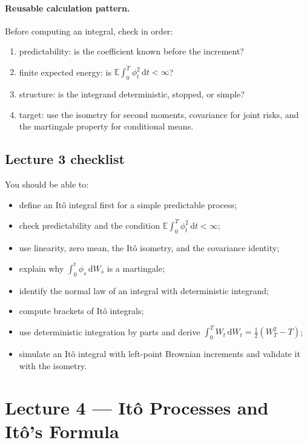 \documentclass[11pt]{article}
\newcommand{\E}{\mathbb{E}}
\newcommand{\dd}{\,\mathrm{d}}
\newcommand{\1}{\mathbf{1}}
\theoremstyle{plain}
\theoremstyle{definition}
\theoremstyle{remark}
\begin{document}
\paragraph{Reusable calculation pattern.}
Before computing an integral, check in order:
\begin{enumerate}[leftmargin=1.6em,itemsep=0.15em]
  \item predictability: is the coefficient known before the increment?
  \item finite expected energy: is
        \(\E\int_0^T\phi_t^2\dd t<\infty\)?
  \item structure: is the integrand deterministic, stopped, or simple?
  \item target: use the isometry for second moments, covariance for joint
        risks, and the martingale property for conditional means.
\end{enumerate}

\subsection*{Lecture 3 checklist}

You should be able to:
\begin{itemize}[leftmargin=1.5em,itemsep=0.15em]
  \item define an It\^o integral first for a simple predictable process;
  \item check predictability and the condition
        $\E\int_0^T\phi_t^2\dd t<\infty$;
  \item use linearity, zero mean, the It\^o isometry, and the covariance
        identity;
  \item explain why $\int_0^t\phi_s\dd W_s$ is a martingale;
  \item identify the normal law of an integral with deterministic integrand;
  \item compute brackets of It\^o integrals;
  \item use deterministic integration by parts and derive
        $\int_0^T W_t\dd W_t=\tfrac12(W_T^2-T)$;
  \item simulate an It\^o integral with left-point Brownian increments and
        validate it with the isometry.
\end{itemize}


\section{Lecture 4 --- It\^o Processes and It\^o's Formula}
\end{document}
